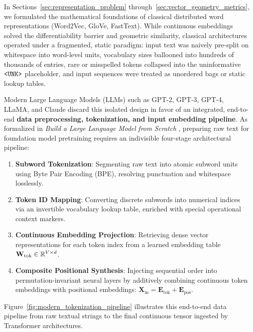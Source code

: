 \documentclass[../../main.tex]{subfiles}
\begin{document}
In Sections~\ref{sec:representation_problem} through~\ref{sec:vector_geometry_metrics}, we formulated the mathematical foundations of classical distributed word representations (Word2Vec, GloVe, FastText). While continuous embeddings solved the differentiability barrier and geometric similarity, classical architectures operated under a fragmented, static paradigm: input text was naively pre-split on whitespace into word-level units, vocabulary sizes ballooned into hundreds of thousands of entries, rare or misspelled tokens collapsed into the uninformative $\text{\texttt{<UNK>}}$ placeholder, and input sequences were treated as unordered bags or static lookup tables.

Modern Large Language Models (LLMs) such as GPT-2, GPT-3, GPT-4, LLaMA, and Claude discard this isolated design in favor of an integrated, end-to-end \textbf{data preprocessing, tokenization, and input embedding pipeline}. As formalized in \emph{Build a Large Language Model from Scratch} \cite{raschka2024llm}, preparing raw text for foundation model pretraining requires an indivisible four-stage architectural pipeline:
\begin{enumerate}
    \item \textbf{Subword Tokenization}: Segmenting raw text into atomic subword units using Byte Pair Encoding (BPE), resolving punctuation and whitespace losslessly.
    \item \textbf{Token ID Mapping}: Converting discrete subwords into numerical indices via an invertible vocabulary lookup table, enriched with special operational context markers.
    \item \textbf{Continuous Embedding Projection}: Retrieving dense vector representations for each token index from a learned embedding table $\mathbf{W}_{\text{tok}} \in \mathbb{R}^{V \times d}$.
    \item \textbf{Composite Positional Synthesis}: Injecting sequential order into permutation-invariant neural layers by additively combining continuous token embeddings with positional embeddings: $\mathbf{X}_{\text{in}} = \mathbf{E}_{\text{tok}} + \mathbf{E}_{\text{pos}}$.
\end{enumerate}

Figure~\ref{fig:modern_tokenization_pipeline} illustrates this end-to-end data pipeline from raw textual strings to the final continuous tensor ingested by Transformer architectures.
\end{document}
